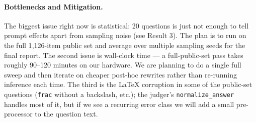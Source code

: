 \documentclass{article}
\begin{document}
\paragraph{Bottlenecks and Mitigation.}
The biggest issue right now is statistical: 20 questions is just not
enough to tell prompt effects apart from sampling noise (see
Result 3). The plan is to run on the full 1{,}126-item public set and
average over multiple sampling seeds for the final report. The
second issue is wall-clock time --- a full-public-set pass takes
roughly 90--120 minutes on our hardware. We are planning to do a
single full sweep and then iterate on cheaper post-hoc rewrites
rather than re-running inference each time. The third is the
LaTeX corruption in some of the public-set questions
(\texttt{frac} without a backslash, etc.); the judger's
\texttt{normalize\_answer} handles most of it, but if we see a
recurring error class we will add a small pre-processor to the
question text.
\end{document}
